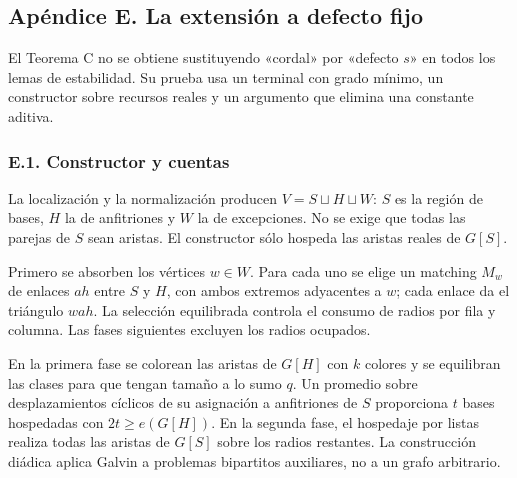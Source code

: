 \documentclass[spanish,11pt,a4paper]{article}
\begin{document}
\subsection{Apéndice E. La extensión a defecto fijo}\label{apendice-e.-la-extension-a-defecto-fijo}

El Teorema C no se obtiene sustituyendo «cordal» por «defecto \(s\)» en todos los lemas de estabilidad. Su prueba usa un terminal con grado mínimo, un constructor sobre recursos reales y un argumento que elimina una constante aditiva.

\subsubsection{E.1. Constructor y cuentas}\label{e.1.-constructor-y-cuentas}

La localización y la normalización producen \(V=S\sqcup H\sqcup W\): \(S\) es la región de bases, \(H\) la de anfitriones y \(W\) la de excepciones. No se exige que todas las parejas de \(S\) sean aristas. El constructor sólo hospeda las aristas reales de \(G[S]\).

Primero se absorben los vértices \(w\in W\). Para cada uno se elige un matching \(M_w\) de enlaces \(ah\) entre \(S\) y \(H\), con ambos extremos adyacentes a \(w\); cada enlace da el triángulo \(wah\). La selección equilibrada controla el consumo de radios por fila y columna. Las fases siguientes excluyen los radios ocupados.

En la primera fase se colorean las aristas de \(G[H]\) con \(k\) colores y se equilibran las clases para que tengan tamaño a lo sumo \(q\). Un promedio sobre desplazamientos cíclicos de su asignación a anfitriones de \(S\) proporciona \(t\) bases hospedadas con \(2t\ge e(G[H])\). En la segunda fase, el hospedaje por listas realiza todas las aristas de \(G[S]\) sobre los radios restantes. La construcción diádica aplica Galvin a problemas bipartitos auxiliares, no a un grafo arbitrario.
\end{document}
